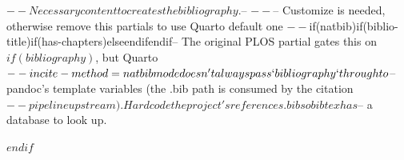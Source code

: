 $-- Necessary content to creates the bibliography.
$--
$-- %
$-- Customize is needed, otherwise remove this partials to use Quarto default one
$-- %
$if(natbib)$
$if(biblio-title)$
$if(has-chapters)$
\renewcommand\bibname{$biblio-title$}
$else$
\renewcommand\refname{$biblio-title$}
$endif$
$endif$
$-- The original PLOS partial gates this on $if(bibliography)$, but Quarto
$-- in cite-method=natbib mode doesn't always pass `bibliography` through to
$-- pandoc's template variables (the .bib path is consumed by the citation
$-- pipeline upstream). Hardcode the project's references.bib so bibtex has
$-- a database to look up.

$endif$